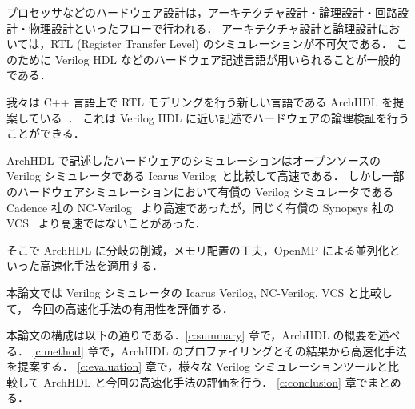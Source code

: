 プロセッサなどのハードウェア設計は，アーキテクチャ設計・論理設計・回路設計・物理設計といったフローで行われる．
アーキテクチャ設計と論理設計においては，RTL (Register Transfer Level) のシミュレーションが不可欠である．
このために Verilog HDL などのハードウェア記述言語が用いられることが一般的である．

我々は C++ 言語上で RTL モデリングを行う新しい言語である ArchHDL を提案している~\cite{satos:archhdl}．
これは Verilog HDL に近い記述でハードウェアの論理検証を行うことができる．

ArchHDL で記述したハードウェアのシミュレーションはオープンソースの Verilog シミュレータである Icarus Verilog~\cite{iverilog}と比較して高速である．
しかし一部のハードウェアシミュレーションにおいて有償の Verilog シミュレータである Cadence 社の NC-Verilog~\cite{ncverilog} より高速であったが，同じく有償の Synopsys 社の VCS~\cite{vcs} より高速ではないことがあった．

そこで ArchHDL に分岐の削減，メモリ配置の工夫，OpenMP による並列化といった高速化手法を適用する．

本論文では Verilog シミュレータの Icarus Verilog, NC-Verilog, VCS と比較して，
今回の高速化手法の有用性を評価する．

本論文の構成は以下の通りである．\ref{c:summary} 章で，ArchHDL の概要を述べる．
\ref{c:method} 章で，ArchHDL のプロファイリングとその結果から高速化手法を提案する．
\ref{c:evaluation} 章で，様々な Verilog シミュレーションツールと比較して ArchHDL と今回の高速化手法の評価を行う．
\ref{c:conclusion} 章でまとめる．